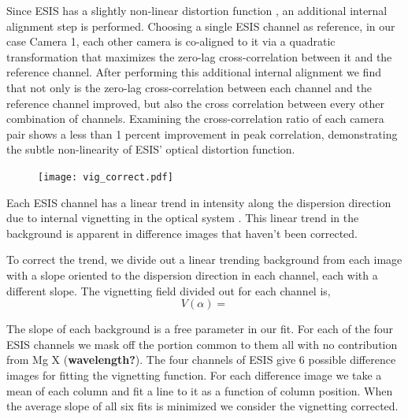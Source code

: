         Since ESIS has a slightly non-linear distortion function \citep{ESIS}, an additional internal alignment step is performed.
        Choosing a single ESIS channel as reference, in our case Camera 1, each other camera is co-aligned to it via a quadratic transformation that maximizes the zero-lag cross-correlation between it and the reference channel.
        After performing this additional internal alignment we find that not only is the zero-lag cross-correlation between each channel and the reference channel improved, but also the cross correlation between every other combination of channels.
        Examining the cross-correlation ratio of each camera pair shows a less than 1 percent improvement in peak correlation, demonstrating the subtle non-linearity of ESIS' optical distortion function.
        
        \begin{figure}
        	\centering
        	\texttt{[image: vig\_correct.pdf]}
        	\caption{}
        	\label{fig:vig_correct}
        \end{figure}
        	
        Each ESIS channel has a linear trend in intensity along the dispersion direction due to internal vignetting in the optical system \citep{ESIS}.
        This linear trend in the background is apparent in difference images that haven't been corrected.
        
        To correct the trend, we divide out a linear trending background from each image with a slope oriented to the dispersion direction in each channel, each with a different slope.
        The vignetting field divided out for each channel is,
            \begin{equation}
                \label{eqn:vignet}
                V(\alpha) = 
            \end{equation}
        
        The slope of each background is a free parameter in our fit.
        For each of the four ESIS channels we mask off the portion common to them all with no contribution from Mg X (\textbf{wavelength?}).
        The four channels of ESIS give 6 possible difference images for fitting the vignetting function. 
        For each difference image we take a mean of each column and fit a line to it as a function of column position.
        When the average slope of all six fits is minimized we consider the vignetting corrected. 
        

        
        
